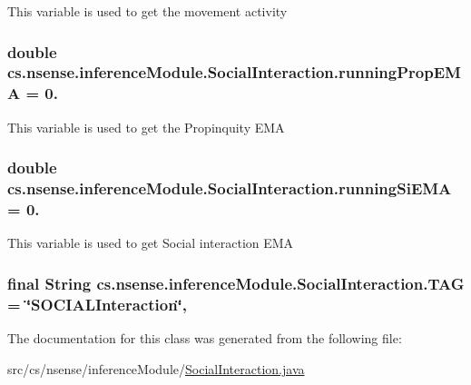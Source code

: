 This variable is used to get the movement activity \hypertarget{classcs_1_1nsense_1_1inference_module_1_1_social_interaction_aaf7bdd81db03af4288d6b9fb8adc86e4}{
\subsubsection[{running\-Prop\-E\-M\-A}]{\setlength{\rightskip}{0pt plus 5cm}double cs.\-nsense.\-inference\-Module.\-Social\-Interaction.\-running\-Prop\-E\-M\-A = 0.\hspace{0.3cm}{\ttfamily [private]}}}\label{classcs_1_1nsense_1_1inference_module_1_1_social_interaction_aaf7bdd81db03af4288d6b9fb8adc86e4}
This variable is used to get the Propinquity E\-M\-A \hypertarget{classcs_1_1nsense_1_1inference_module_1_1_social_interaction_ae4104c0160e4ab9e56047ecebcb57f91}{
\subsubsection[{running\-Si\-E\-M\-A}]{\setlength{\rightskip}{0pt plus 5cm}double cs.\-nsense.\-inference\-Module.\-Social\-Interaction.\-running\-Si\-E\-M\-A = 0.\hspace{0.3cm}{\ttfamily [private]}}}\label{classcs_1_1nsense_1_1inference_module_1_1_social_interaction_ae4104c0160e4ab9e56047ecebcb57f91}
This variable is used to get Social interaction E\-M\-A \hypertarget{classcs_1_1nsense_1_1inference_module_1_1_social_interaction_a8e890805038a74a8fd5aa9e57a09cd61}{
\subsubsection[{T\-A\-G}]{\setlength{\rightskip}{0pt plus 5cm}final String cs.\-nsense.\-inference\-Module.\-Social\-Interaction.\-T\-A\-G = \char`\"{}S\-O\-C\-I\-A\-L\-Interaction\char`\"{}\hspace{0.3cm}{\ttfamily [static]}, {\ttfamily [private]}}}\label{classcs_1_1nsense_1_1inference_module_1_1_social_interaction_a8e890805038a74a8fd5aa9e57a09cd61}


The documentation for this class was generated from the following file\-:\begin{DoxyCompactItemize}
\item 
src/cs/nsense/inference\-Module/\hyperlink{_social_interaction_8java}{Social\-Interaction.\-java}\end{DoxyCompactItemize}
